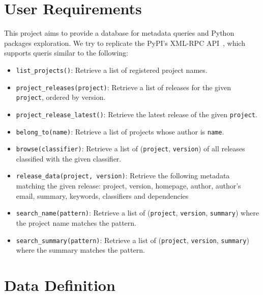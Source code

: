 \documentclass[a4paper,12pt]{article}
\begin{document}
\section{User Requirements}\label{req}
This project aims to provide a database for metadata queries and Python packages
exploration.  We try to replicate the PyPI's XML-RPC API~\cite{xmlrpc},
which supports queris similar to the following:
\begin{itemize}
  \item \verb|list_projects()|: Retrieve a list of registered project names.
  \item \verb|project_releases(project)|: Retrieve a list of releases for
    the given \verb|project|, ordered by version.
  \item \verb|project_release_latest()|: Retrieve the latest release
    of the given \verb|project|.
  \item \verb|belong_to(name)|: Retrieve a list of projects whose author
    is \verb|name|.
  \item \verb|browse(classifier)|: Retrieve a list of (\verb|project|,
    \verb|version|) of all releases classified with the given classifier.
  \item \verb|release_data(project, version)|: Retrieve the following metadata
    matching the given release: project, version, homepage, author,
    author's email, summary, keywords, classifiers and dependencies
  \item \verb|search_name(pattern)|: Retrieve a list of (\verb|project|,
    \verb|version|, \verb|summary|) where the project name matches the pattern.
  \item \verb|search_summary(pattern)|: Retrieve a list of (\verb|project|,
    \verb|version|, \verb|summary|) where the summary matches the pattern.
\end{itemize}

\section{Data Definition}
\end{document}
